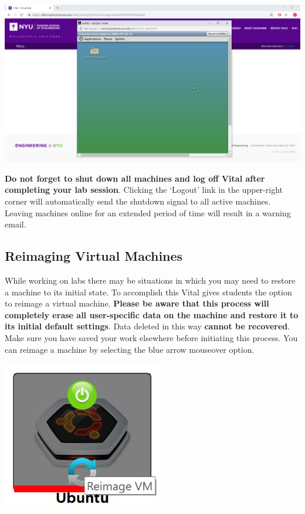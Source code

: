 \documentclass[12pt]{article}
\begin{document}
{%
\centering
\includegraphics[scale=0.30]{vm_interface.png}

}

\textbf{Do not forget to shut down all machines and log off Vital after completing your lab session}. Clicking the ‘Logout’ link in the upper-right corner will automatically send the shutdown signal to all active machines. Leaving machines online for an extended period of time will result in a warning email.


\subsection*{Reimaging Virtual Machines}
While working on labs there may be situations in which you may need to restore a machine to its initial state. To accomplish this Vital gives students the option to reimage a virtual machine. \textbf{Please be aware that this process will completely erase all user-specific data on the machine and restore it to its initial default settings}. Data deleted in this way \textbf{cannot be recovered}. Make sure you have saved your work elsewhere before initiating this process.  You can reimage a machine by selecting the blue arrow mouseover option.


{%
\centering
\includegraphics[scale=0.50]{reimage_vm.png}

}
\end{document}

